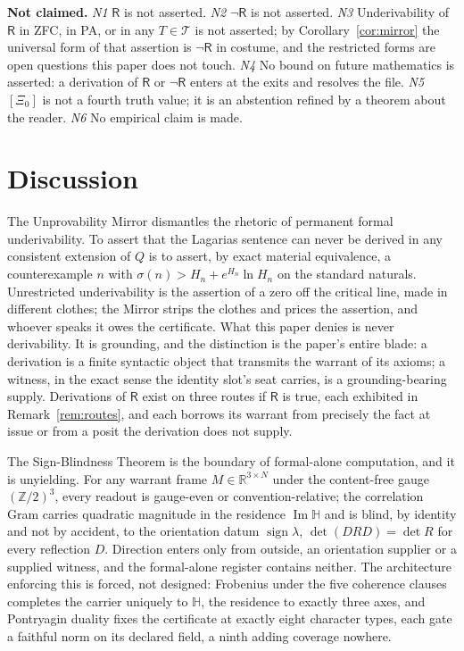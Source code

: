 \documentclass[twocolumn,10pt]{article}
\theoremstyle{plain}
\theoremstyle{definition}
\newcommand{\tXi}{[\Xi_0]}
\newcommand{\R}{\mathsf{R}}
\newcommand{\Rl}{\mathbb{R}}
\newcommand{\Hq}{\mathbb{H}}
\begin{document}
\noindent\textbf{Not claimed.}
\emph{N1} $\R$ is not asserted. 
\emph{N2} $\neg\R$ is not asserted. 
\emph{N3} Underivability of $\R$ in ZFC, in PA, or in any $T\in\mathcal T$ is not asserted; by Corollary~\ref{cor:mirror} the universal form of that assertion is $\neg\R$ in costume, and the restricted forms are open questions this paper does not touch. 
\emph{N4} No bound on future mathematics is asserted: a derivation of $\R$ or $\neg\R$ enters at the exits and resolves the file. 
\emph{N5} $\tXi$ is not a fourth truth value; it is an abstention refined by a theorem about the reader. 
\emph{N6} No empirical claim is made.

\section{Discussion}\label{sec:disc}
The Unprovability Mirror dismantles the rhetoric of permanent formal underivability. To assert that the Lagarias sentence can never be derived in any consistent extension of $Q$ is to assert, by exact material equivalence, a counterexample $n$ with $\sigma(n)>H_n+e^{H_n}\ln H_n$ on the standard naturals. Unrestricted underivability is the assertion of a zero off the critical line, made in different clothes; the Mirror strips the clothes and prices the assertion, and whoever speaks it owes the certificate. What this paper denies is never derivability. It is grounding, and the distinction is the paper's entire blade: a derivation is a finite syntactic object that transmits the warrant of its axioms; a witness, in the exact sense the identity slot's seat carries, is a grounding-bearing supply. Derivations of $\R$ exist on three routes if $\R$ is true, each exhibited in Remark~\ref{rem:routes}, and each borrows its warrant from precisely the fact at issue or from a posit the derivation does not supply.

The Sign-Blindness Theorem is the boundary of formal-alone computation, and it is unyielding. For any warrant frame $M\in\Rl^{3\times N}$ under the content-free gauge $(\mathbb Z/2)^3$, every readout is gauge-even or convention-relative; the correlation Gram carries quadratic magnitude in the residence $\operatorname{Im}\Hq$ and is blind, by identity and not by accident, to the orientation datum $\operatorname{sign}\lambda$, $\det(DRD)=\det R$ for every reflection $D$. Direction enters only from outside, an orientation supplier or a supplied witness, and the formal-alone register contains neither. The architecture enforcing this is forced, not designed: Frobenius under the five coherence clauses completes the carrier uniquely to $\Hq$, the residence to exactly three axes, and Pontryagin duality fixes the certificate at exactly eight character types, each gate a faithful norm on its declared field, a ninth adding coverage nowhere.
\end{document}
